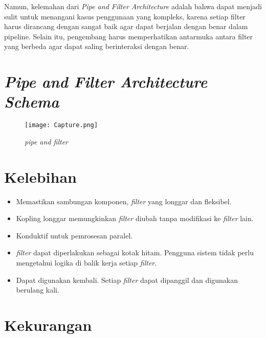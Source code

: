 	Namun, kelemahan dari \textit{Pipe and Filter Architecture} adalah bahwa dapat menjadi sulit untuk menangani kasus penggunaan yang kompleks, karena setiap filter harus dirancang dengan sangat baik agar dapat berjalan dengan benar dalam pipeline. Selain itu, pengembang harus memperhatikan antarmuka antara filter yang berbeda agar dapat saling berinteraksi dengan benar.
	
	
	\section{\textit{Pipe and Filter Architecture Schema}}
		\begin{figure}[h] 
		\begin{center} 
			\renewcommand{\figurename}{Gambar} 
			\texttt{[image: Capture.png]} 
			\caption{\textit{pipe and filter}} 
			\label{gambar} 
		\end{center} 
	\end{figure}
	
	\section{Kelebihan}
	
	\begin{itemize}
		\item Memastikan sambungan komponen, \textit{filter} yang longgar dan fleksibel.
		\item Kopling longgar memungkinkan \textit{filter} diubah tanpa modifikasi ke \textit{filter} lain.
		\item Konduktif untuk pemrosesan paralel.
		\item\textit{filter} dapat diperlakukan sebagai kotak hitam. Pengguna sistem tidak perlu mengetahui logika di balik kerja setiap \textit{filter}.
		\item Dapat digunakan kembali. Setiap \textit{filter} dapat dipanggil dan digunakan berulang kali.
	\end{itemize}
	
	
	\section{Kekurangan}
	
